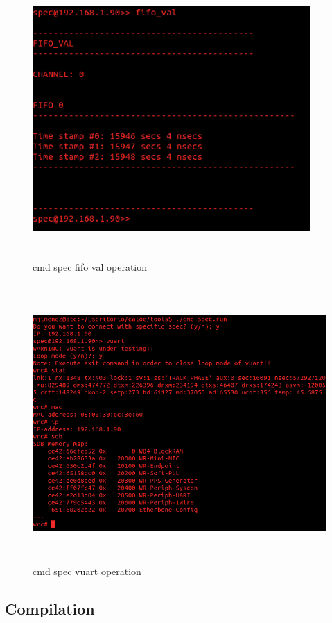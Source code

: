 \begin{figure}[H]
\centering
\includegraphics[width=400px,height=400px]{img/cmd_spec_dio_fifo.png}
\caption{cmd spec fifo val operation}
\label{cmd_spec_fifo_val_img}
\end{figure}

\begin{figure}[H]
\centering
\includegraphics[width=500px,height=400px]{img/cmd_spec_vuart.png}
\caption{cmd spec vuart operation}
\label{cmd_spec_vuart_img}
\end{figure}

\subsection{Compilation}

